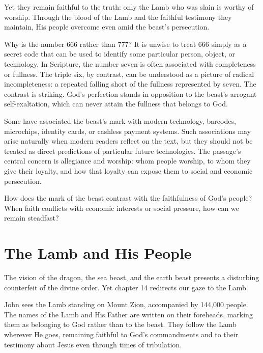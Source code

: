Yet they remain faithful to the truth: only the Lamb who was slain is worthy of worship. Through the blood of the Lamb and the faithful testimony they maintain, His people overcome even amid the beast's persecution.

Why is the number 666 rather than 777? It is unwise to treat 666 simply as a secret code that can be used to identify some particular person, object, or technology. In Scripture, the number seven is often associated with completeness or fullness. The triple six, by contrast, can be understood as a picture of radical incompleteness: a repeated falling short of the fullness represented by seven. The contrast is striking. God's perfection stands in opposition to the beast's arrogant self-exaltation, which can never attain the fullness that belongs to God.

Some have associated the beast's mark with modern technology, barcodes, microchips, identity cards, or cashless payment systems. Such associations may arise naturally when modern readers reflect on the text, but they should not be treated as direct predictions of particular future technologies. The passage's central concern is allegiance and worship: whom people worship, to whom they give their loyalty, and how that loyalty can expose them to social and economic persecution.

\begin{ReaderQuestion}
How does the mark of the beast contrast with the faithfulness of God's people? When faith conflicts with economic interests or social pressure, how can we remain steadfast?
\end{ReaderQuestion}

\section{The Lamb and His People}

The vision of the dragon, the sea beast, and the earth beast presents a disturbing counterfeit of the divine order. Yet chapter 14 redirects our gaze to the Lamb.

John sees the Lamb standing on Mount Zion, accompanied by 144,000 people. The names of the Lamb and His Father are written on their foreheads, marking them as belonging to God rather than to the beast. They follow the Lamb wherever He goes, remaining faithful to God's commandments and to their testimony about Jesus even through times of tribulation.


